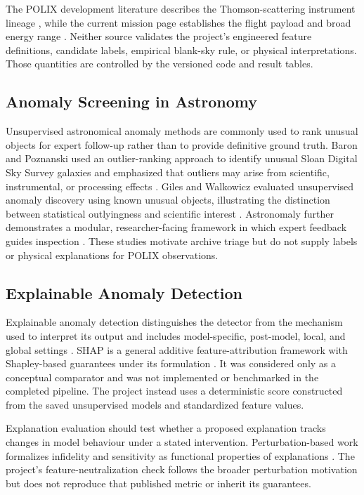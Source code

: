 \documentclass[conference]{IEEEtran}
\begin{document}
The POLIX development literature describes the Thomson-scattering instrument lineage \cite{rishin2010thomson}, while the current mission page establishes the flight payload and broad energy range \cite{isro_xposat}. Neither source validates the project's engineered feature definitions, candidate labels, empirical blank-sky rule, or physical interpretations. Those quantities are controlled by the versioned code and result tables.


\subsection{Anomaly Screening in Astronomy}

Unsupervised astronomical anomaly methods are commonly used to rank unusual objects for expert follow-up rather than to provide definitive ground truth. Baron and Poznanski used an outlier-ranking approach to identify unusual Sloan Digital Sky Survey galaxies and emphasized that outliers may arise from scientific, instrumental, or processing effects \cite{baron2017weirdest}. Giles and Walkowicz evaluated unsupervised anomaly discovery using known unusual objects, illustrating the distinction between statistical outlyingness and scientific interest \cite{giles2019serendipity}. Astronomaly further demonstrates a modular, researcher-facing framework in which expert feedback guides inspection \cite{lochner2021astronomaly}. These studies motivate archive triage but do not supply labels or physical explanations for POLIX observations.


\subsection{Explainable Anomaly Detection}

Explainable anomaly detection distinguishes the detector from the mechanism used to interpret its output and includes model-specific, post-model, local, and global settings \cite{li2024explainable_anomaly}. SHAP is a general additive feature-attribution framework with Shapley-based guarantees under its formulation \cite{lundberg2017shap}. It was considered only as a conceptual comparator and was not implemented or benchmarked in the completed pipeline. The project instead uses a deterministic score constructed from the saved unsupervised models and standardized feature values.


Explanation evaluation should test whether a proposed explanation tracks changes in model behaviour under a stated intervention. Perturbation-based work formalizes infidelity and sensitivity as functional properties of explanations \cite{yeh2019infidelity}. The project's feature-neutralization check follows the broader perturbation motivation but does not reproduce that published metric or inherit its guarantees.
\end{document}
